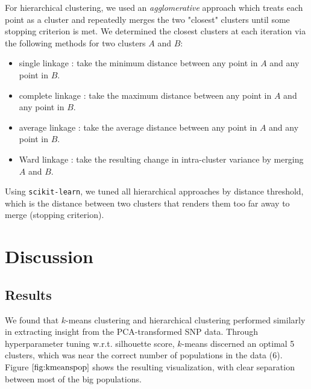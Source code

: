 \documentclass[11pt]{article}
\newcommand{\code}[1]{\texttt{#1}}
\theoremstyle{definition}
\begin{document}
\noindent For hierarchical clustering, we used an \textit{agglomerative} approach which treats each point as a cluster and repeatedly merges the two "closest" clusters until some stopping criterion is met. We determined the closest clusters at each iteration via the following methods for two clusters $A$ and $B$:
\begin{itemize}
    \item single linkage \cite{singlecomplete}: take the minimum distance between any point in $A$ and any point in $B$.
    \item complete linkage \cite{singlecomplete}: take the maximum distance between any point in $A$ and any point in $B$.
    \item average linkage \cite{average}: take the average distance between any point in $A$ and any point in $B$.
    \item Ward linkage \cite{ward}: take the resulting change in intra-cluster variance by merging $A$ and $B$.
\end{itemize}

\noindent Using \code{scikit-learn}, we tuned all hierarchical approaches by distance threshold, which is the distance between two clusters that renders them too far away to merge (stopping criterion).

\section{Discussion}\label{sec:discussion}
\subsection{Results}\label{subsec:comparison}
\noindent We found that $k$-means clustering and hierarchical clustering performed similarly in extracting insight from the PCA-transformed SNP data. Through hyperparameter tuning w.r.t. silhouette score, $k$-means discerned an optimal 5 clusters, which was near the correct number of populations in the data (6). Figure $\ref{fig:kmeanspop}$ shows the resulting visualization, with clear separation between most of the big populations. 
\end{document}
